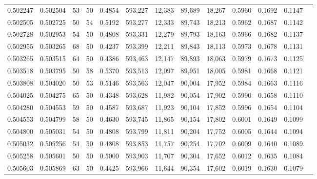 \begin{tabular}{rrrrrrrrrrrrr}
0.502247 & 0.502504 &    53 &  50 &                                     0.4854 & 593,227 &  12,383 &  89,689 &  18,267 & 0.5960 & 0.1692 & 0.1147 \\
0.502505 & 0.502725 &    50 &  54 &                                     0.5192 & 593,277 &  12,333 &  89,743 &  18,213 & 0.5962 & 0.1687 & 0.1142 \\
0.502728 & 0.502953 &    54 &  50 &                                     0.4808 & 593,331 &  12,279 &  89,793 &  18,163 & 0.5966 & 0.1682 & 0.1137 \\
0.502955 & 0.503265 &    68 &  50 &                                     0.4237 & 593,399 &  12,211 &  89,843 &  18,113 & 0.5973 & 0.1678 & 0.1131 \\
0.503265 & 0.503515 &    64 &  50 &                                     0.4386 & 593,463 &  12,147 &  89,893 &  18,063 & 0.5979 & 0.1673 & 0.1125 \\
0.503518 & 0.503795 &    50 &  58 &                                     0.5370 & 593,513 &  12,097 &  89,951 &  18,005 & 0.5981 & 0.1668 & 0.1121 \\
0.503808 & 0.504020 &    50 &  53 &                                     0.5146 & 593,563 &  12,047 &  90,004 &  17,952 & 0.5984 & 0.1663 & 0.1116 \\
0.504025 & 0.504275 &    65 &  50 &                                     0.4348 & 593,628 &  11,982 &  90,054 &  17,902 & 0.5990 & 0.1658 & 0.1110 \\
0.504280 & 0.504553 &    59 &  50 &                                     0.4587 & 593,687 &  11,923 &  90,104 &  17,852 & 0.5996 & 0.1654 & 0.1104 \\
0.504553 & 0.504799 &    58 &  50 &                                     0.4630 & 593,745 &  11,865 &  90,154 &  17,802 & 0.6001 & 0.1649 & 0.1099 \\
0.504800 & 0.505031 &    54 &  50 &                                     0.4808 & 593,799 &  11,811 &  90,204 &  17,752 & 0.6005 & 0.1644 & 0.1094 \\
0.505032 & 0.505256 &    54 &  50 &                                     0.4808 & 593,853 &  11,757 &  90,254 &  17,702 & 0.6009 & 0.1640 & 0.1089 \\
0.505258 & 0.505601 &    50 &  50 &                                     0.5000 & 593,903 &  11,707 &  90,304 &  17,652 & 0.6012 & 0.1635 & 0.1084 \\
0.505603 & 0.505869 &    63 &  50 &                                     0.4425 & 593,966 &  11,644 &  90,354 &  17,602 & 0.6019 & 0.1630 & 0.1079 \\

\end{tabular}
